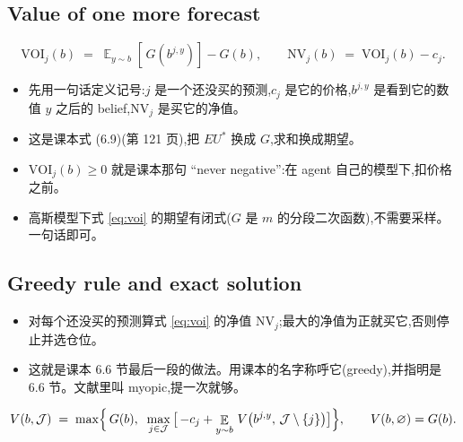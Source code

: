 \documentclass{article}
\newenvironment{pts}{\begin{itemize}[nosep,leftmargin=1.15em,topsep=1pt]}{\end{itemize}}
\newcommand{\rest}{\mathcal{J}}          %
\DeclareMathOperator{\E}{\mathbb{E}}
\begin{document}
\subsection{Value of one more forecast}

\begin{equation}
\mathrm{VOI}_j(b) \;=\; \E_{y \sim b}\!\left[\,G\!\left(b^{j,y}\right)\right] - G(b),
\qquad
\mathrm{NV}_j(b) \;=\; \mathrm{VOI}_j(b) - c_j .
\label{eq:voi}
\end{equation}

\begin{note}[约 60 词]
\begin{pts}
\item 先用一句话定义记号:$j$ 是一个还没买的预测,$c_j$ 是它的价格,$b^{j,y}$ 是看到它的数值 $y$ 之后的 belief,$\mathrm{NV}_j$ 是买它的净值。
\item 这是课本式 (6.9)(第 121 页),把 $EU^{*}$ 换成 $G$,求和换成期望。
\item $\mathrm{VOI}_j(b) \ge 0$ 就是课本那句 ``never negative'':在 agent 自己的模型下,扣价格之前。
\item 高斯模型下式 \eqref{eq:voi} 的期望有闭式($G$ 是 $m$ 的分段二次函数),不需要采样。一句话即可。
\end{pts}
\end{note}

\subsection{Greedy rule and exact solution}

\begin{note}[约 50 词:贪心做法]
\begin{pts}
\item 对每个还没买的预测算式 \eqref{eq:voi} 的净值 $\mathrm{NV}_j$;最大的净值为正就买它,否则停止并选仓位。
\item 这就是课本 6.6 节最后一段的做法。用课本的名字称呼它(greedy),并指明是 6.6 节。文献里叫 myopic,提一次就够。
\end{pts}
\end{note}

\begin{equation}
V(b, \rest) \;=\; \max\Bigl\{\, G(b),\;\; \max_{j \in \rest}\,\bigl[\, -c_j + \E_{y \sim b}\, V\bigl(b^{j,y},\, \rest \setminus \{j\}\bigr) \bigr] \Bigr\},
\qquad V(b, \varnothing) = G(b).
\label{eq:bellman}
\end{equation}
\end{document}
